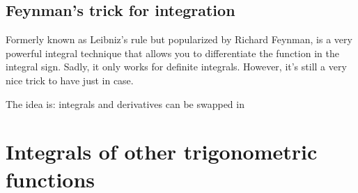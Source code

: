 \subsection{Feynman's trick for integration}

Formerly known as Leibniz's rule but popularized by Richard Feynman, is a very powerful integral technique that allows you to differentiate the function in the integral sign. Sadly, it only works for definite integrals. However, it's still a very nice trick to have just in case.

The idea is: integrals and derivatives can be swapped in 

\section{Integrals of other trigonometric functions}
